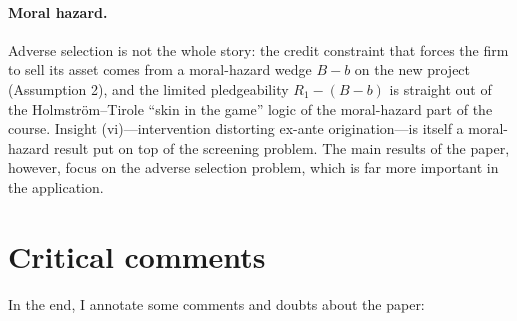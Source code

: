 \documentclass[11pt]{article}
\theoremstyle{definition}
\theoremstyle{plain}
\begin{document}
\paragraph{Moral hazard.} Adverse selection is not the whole story:
the credit constraint that forces the firm to sell its asset comes from a
moral-hazard wedge $B-b$ on the new project (Assumption 2), and the
limited pledgeability $R_1-(B-b)$ is straight out of the Holmstr\"om--Tirole
``skin in the game'' logic of the moral-hazard part of the course. Insight (vi)---intervention distorting ex-ante origination---is itself a moral-hazard result put on top of the screening problem. The main results of the paper,  however, focus on the adverse selection problem, which is far more important in the application.
\section{Critical comments}
\label{section3}
In the end, I annotate some comments and doubts about the paper:
\end{document}
